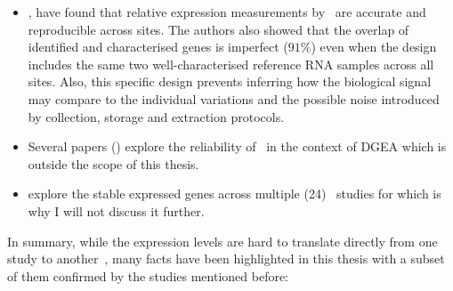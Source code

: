\begin{itemize}[topsep=0pt,nosep]
subsets of \gtex\ and \tcga\ raw data that they have quantified \mRNAs\ at
transcript levels with  (hg19).
They have corrected for the study effect with 
and have released the normalised data to the community.
Note that \egxa\ provides more recent versions of the \gtex\ and \tcga\
(as a part of the \pcawg\ project\footnote{\pcawg\ project
analyses conjointly all available kind of research data related to cancer}) data.\mybr\
\item\hspace{-1mm}\fullcite{seqcmaqc}, have found that relative expression measurements
by \Rnaseq\ are accurate and reproducible across sites.
The authors also showed that the overlap of identified and characterised genes
is imperfect ($91$\%)
even when the design includes
the same two well-characterised reference RNA samples across all sites.
Also,
this specific design prevents inferring how the biological signal
may compare to the individual variations and the possible noise introduced
by collection, storage and extraction protocols.\mybr\
\item Several papers (\cite{Khang2015-qt,ruvseqComQN,Rau2014-va})
    explore the reliability of \Rnaseq\ in the context of
    \gls{DGEA} which is outside the scope of this thesis.\mybr\
\item\cite{Zhuo2016-qi} explore the stable expressed genes across multiple
    (24) \Rnaseq\ studies for \species{Arabidopsis}
    which is why I will not discuss it further.\mybr\
\end{itemize}


In summary, while the expression levels are hard to translate directly
from one study to another~,
many facts have been highlighted in this thesis with a subset of them confirmed
by the studies mentioned before:\mybr\ %

